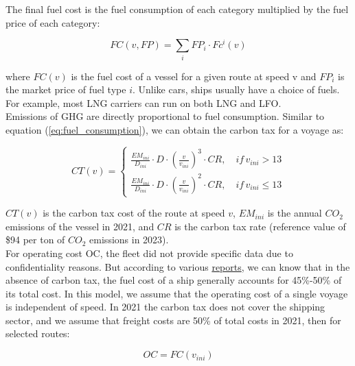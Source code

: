 \documentclass[a4paper,12pt]{article}
\begin{document}
The final fuel cost is the fuel consumption of each category multiplied by the fuel price of each category:

\begin{equation}
	\label{eq:fuel_cost}
	FC(v, FP) = \sum_i FP_i \cdot Fc^i(v)
\end{equation}

where $FC(v)$ is the fuel cost of a vessel for a given route at speed v and $FP_i$ is the market price of fuel type $i$. Unlike cars, ships usually have a choice of fuels. For example, most LNG carriers can run on both LNG and LFO.\\

Emissions of GHG are directly proportional to fuel consumption.
Similar to equation (\ref{eq:fuel_consumption}), we can obtain the carbon tax for a voyage as:

\begin{equation}
	\label{eq:emission}
	CT(v) =
	\left\{
	\begin{aligned}
		\frac{EM_{ini}}{D_{ini}} \cdot D \cdot (\frac{v}{v_{ini}})^3 \cdot CR, \quad if \, v_{ini} > 13 \\
		\frac{EM_{ini}}{D_{ini}} \cdot D \cdot (\frac{v}{v_{ini}})^2 \cdot CR, \quad if \, v_{ini} \leq 13
	\end{aligned}
	\right.
\end{equation}

$CT(v)$ is the carbon tax cost of the route at speed $v$, $EM_{ini}$ is the annual $CO_2$ emissions of the vessel in 2021, and $CR$ is the carbon tax rate (reference value of \$94 per ton of $CO_2$ emissions in 2023).\\

For operating cost OC, the fleet did not provide specific data due to confidentiality reasons.
But according to various \href{https://transportgeography.org/contents/chapter5/maritime-transportation/containerships-operating-costs-panamax-post-panamax/}{reports}, we can know that in the absence of carbon tax, the fuel cost of a ship generally accounts for 45\%-50\% of its total cost.
In this model, we assume that the operating cost of a single voyage is independent of speed.
In 2021 the carbon tax does not cover the shipping sector, and we assume that freight costs are 50\% of total costs in 2021, then for selected routes:

\begin{equation}
	\label{eq:operation_cost}
	OC = FC(v_{ini})
\end{equation}
\end{document}

